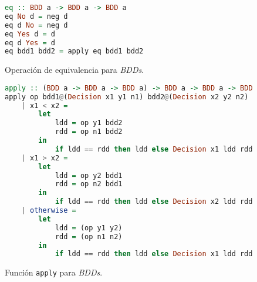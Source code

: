 \begin{figure}
\begin{lstlisting}[language=Haskell]
eq :: BDD a -> BDD a -> BDD a
eq No d = neg d
eq d No = neg d
eq Yes d = d
eq d Yes = d
eq bdd1 bdd2 = apply eq bdd1 bdd2
\end{lstlisting}
\caption{Operación de equivalencia para \textit{BDDs}.}
\label{code:bdd_eq}
\end{figure}


\begin{figure}
\begin{lstlisting}[language=Haskell]
apply :: (BDD a -> BDD a -> BDD a) -> BDD a -> BDD a -> BDD a
apply op bdd1@(Decision x1 y1 n1) bdd2@(Decision x2 y2 n2)
    | x1 < x2 =
        let
            ldd = op y1 bdd2
            rdd = op n1 bdd2
        in
            if ldd == rdd then ldd else Decision x1 ldd rdd
    | x1 > x2 =
        let
            ldd = op y2 bdd1
            rdd = op n2 bdd1
        in
            if ldd == rdd then ldd else Decision x2 ldd rdd
    | otherwise =
        let
            ldd = (op y1 y2)
            rdd = (op n1 n2)
        in
            if ldd == rdd then ldd else Decision x1 ldd rdd
\end{lstlisting}
\caption{Función \texttt{apply} para \textit{BDDs}.}
\label{code:bdd_apply}
\end{figure}

